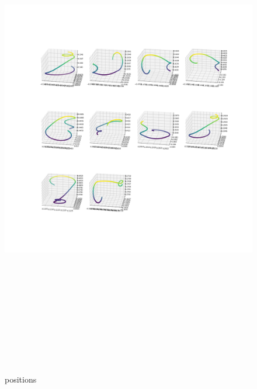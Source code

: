 \documentclass[12pt]{article}
\begin{document}
	\begin{figure}[H]
		\includegraphics[width=\linewidth, height=22cm]{subps3.png} \caption{positions} \label{subps3}
	\end{figure}
\end{document}
